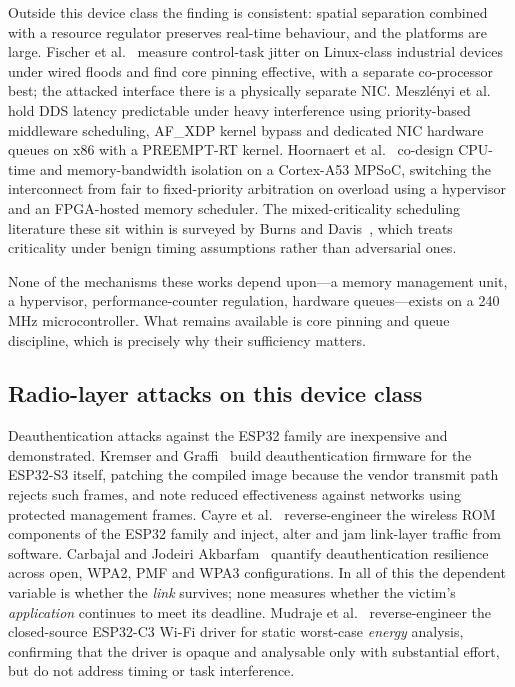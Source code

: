 Outside this device class the finding is consistent: spatial separation combined with a resource
regulator preserves real-time behaviour, and the platforms are large. Fischer
et al.~\cite{fischer2020} measure control-task jitter on Linux-class industrial devices under
wired floods and find core pinning effective, with a separate co-processor best; the attacked
interface there is a physically separate NIC. Meszl\'enyi et al.~\cite{timingiso2025} hold DDS
latency predictable under heavy interference using priority-based middleware scheduling, AF\_XDP
kernel bypass and dedicated NIC hardware queues on x86 with a PREEMPT-RT kernel. Hoornaert
et al.~\cite{mcti2024} co-design CPU-time and memory-bandwidth isolation on a Cortex-A53 MPSoC,
switching the interconnect from fair to fixed-priority arbitration on overload using a hypervisor
and an FPGA-hosted memory scheduler. The mixed-criticality scheduling literature these sit within
is surveyed by Burns and Davis~\cite{mcreview2026}, which treats criticality under benign timing
assumptions rather than adversarial ones.

None of the mechanisms these works depend upon---a memory management unit, a hypervisor,
performance-counter regulation, hardware queues---exists on a 240\,MHz microcontroller. What
remains available is core pinning and queue discipline, which is precisely why their sufficiency
matters.

\subsection{Radio-layer attacks on this device class}

Deauthentication attacks against the ESP32 family are inexpensive and demonstrated. Kremser and
Graffi~\cite{deauther2026} build deauthentication firmware for the ESP32-S3 itself, patching the
compiled image because the vendor transmit path rejects such frames, and note reduced
effectiveness against networks using protected management frames. Cayre
et al.~\cite{espwn2023} reverse-engineer the wireless ROM components of the ESP32 family and
inject, alter and jam link-layer traffic from software. Carbajal and Jodeiri
Akbarfam~\cite{carbajal2026} quantify deauthentication resilience across open, WPA2, PMF and WPA3
configurations. In all of this the dependent variable is whether the \emph{link} survives; none
measures whether the victim's \emph{application} continues to meet its deadline. Mudraje
et al.~\cite{esp32c3re2025} reverse-engineer the closed-source ESP32-C3 Wi-Fi driver for static
worst-case \emph{energy} analysis, confirming that the driver is opaque and analysable only with
substantial effort, but do not address timing or task interference.

